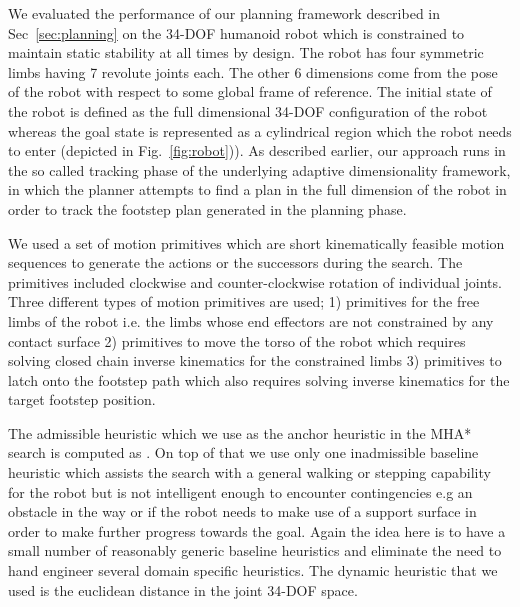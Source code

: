 \documentclass[conference]{IEEEtran}
\begin{document}
We evaluated the performance of our planning framework described in Sec~\ref{sec:planning} on the 34-DOF humanoid robot which is constrained to maintain static stability at all times by design. The robot has four symmetric limbs having 7 revolute joints each. The other 6 dimensions come from the pose of the robot with respect to some global frame of reference. The initial state of the robot is defined as the full dimensional 34-DOF configuration of the robot whereas the goal state is represented as a cylindrical region which the robot needs to enter (depicted in Fig.~\ref{fig:robot})). As described earlier, our approach runs in the so called tracking phase of the underlying adaptive dimensionality framework, in which the planner attempts to find a plan in the full dimension of the robot in order to track the footstep plan generated in the planning phase. 

We used a set of motion primitives which are short kinematically feasible motion sequences to generate the actions or the successors during the search. The primitives included clockwise and counter-clockwise rotation of individual joints. Three different types of motion primitives are used; 1) primitives for the free limbs of the robot i.e. the limbs whose end effectors are not constrained by any contact surface 2) primitives to move the torso of the robot which requires solving closed chain inverse kinematics for the constrained limbs 3) primitives to latch onto the footstep path which also requires solving inverse kinematics for the target footstep position.

The admissible heuristic which we use as the anchor heuristic in the MHA* search is computed as . On top of that we use only one inadmissible baseline heuristic which assists the search with a general walking or stepping capability for the robot but is not intelligent enough to encounter contingencies e.g an obstacle in the way or if the robot needs to make use of a support surface in order to make further progress towards the goal. Again the idea here is to have a small number of reasonably generic baseline heuristics and eliminate the need to hand engineer several domain specific heuristics. The dynamic heuristic that we used is the euclidean distance in the joint 34-DOF space.
\end{document}
